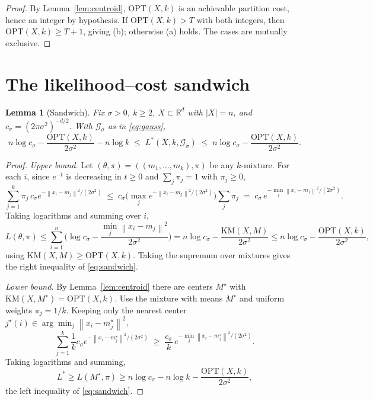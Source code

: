 \documentclass{amsart}
\theoremstyle{plain}
\newtheorem{lemma}{Lemma}
\theoremstyle{definition}
\newcommand{\R}{\mathbb{R}}
\newcommand{\norm}[1]{\left\lVert #1 \right\rVert}
\begin{document}
\begin{proof}
By Lemma~\ref{lem:centroid}, $\mathrm{OPT}(X,k)$ is an achievable partition cost,
hence an integer by hypothesis. If $\mathrm{OPT}(X,k)>T$ with both integers, then
$\mathrm{OPT}(X,k)\ge T+1$, giving (b); otherwise (a) holds. The cases are mutually
exclusive.
\end{proof}

\section{The likelihood--cost sandwich}

\begin{lemma}[Sandwich]\label{lem:sandwich}
Fix $\sigma>0$, $k\ge2$, $X\subset\R^{d}$ with $|X|=n$, and
$c_{\sigma}=(2\pi\sigma^{2})^{-d/2}$. With $\mathcal G_{\sigma}$ as in
\eqref{eq:gauss},
\begin{equation}\label{eq:sandwich}
n\log c_{\sigma}-\frac{\mathrm{OPT}(X,k)}{2\sigma^{2}}-n\log k
\;\le\;
L^{\ast}(X,k,\mathcal G_{\sigma})
\;\le\;
n\log c_{\sigma}-\frac{\mathrm{OPT}(X,k)}{2\sigma^{2}}.
\end{equation}
\end{lemma}

\begin{proof}
\emph{Upper bound.} Let $(\theta,\pi)=((m_{1},\dots,m_{k}),\pi)$ be any
$k$-mixture. For each $i$, since $e^{-t}$ is decreasing in $t\ge0$ and
$\sum_{j}\pi_{j}=1$ with $\pi_{j}\ge0$,
\[
\sum_{j=1}^{k}\pi_{j}\,c_{\sigma}e^{-\norm{x_{i}-m_{j}}^{2}/(2\sigma^{2})}
\;\le\;c_{\sigma}\Big(\max_{j}e^{-\norm{x_{i}-m_{j}}^{2}/(2\sigma^{2})}\Big)\sum_{j}\pi_{j}
\;=\;c_{\sigma}\,e^{-\min_{j}\norm{x_{i}-m_{j}}^{2}/(2\sigma^{2})}.
\]
Taking logarithms and summing over $i$,
\[
L(\theta,\pi)\le\sum_{i=1}^{n}\Big(\log c_{\sigma}-\frac{\min_{j}\norm{x_{i}-m_{j}}^{2}}{2\sigma^{2}}\Big)
=n\log c_{\sigma}-\frac{\mathrm{KM}(X,M)}{2\sigma^{2}}
\le n\log c_{\sigma}-\frac{\mathrm{OPT}(X,k)}{2\sigma^{2}},
\]
using $\mathrm{KM}(X,M)\ge\mathrm{OPT}(X,k)$. Taking the supremum over mixtures
gives the right inequality of \eqref{eq:sandwich}.

\emph{Lower bound.} By Lemma~\ref{lem:centroid} there are centers $M^{\star}$ with
$\mathrm{KM}(X,M^{\star})=\mathrm{OPT}(X,k)$. Use the mixture with means
$M^{\star}$ and uniform weights $\pi_{j}=1/k$. Keeping only the nearest center
$j^{\star}(i)\in\arg\min_{j}\norm{x_{i}-m^{\star}_{j}}^{2}$,
\[
\sum_{j=1}^{k}\frac1k c_{\sigma}e^{-\norm{x_{i}-m^{\star}_{j}}^{2}/(2\sigma^{2})}
\;\ge\;\frac{c_{\sigma}}{k}\,e^{-\min_{j}\norm{x_{i}-m^{\star}_{j}}^{2}/(2\sigma^{2})}.
\]
Taking logarithms and summing,
\[
L^{\ast}\ge L(M^{\star},\pi)\ge n\log c_{\sigma}-n\log k-\frac{\mathrm{OPT}(X,k)}{2\sigma^{2}},
\]
the left inequality of \eqref{eq:sandwich}.
\end{proof}
\end{document}
